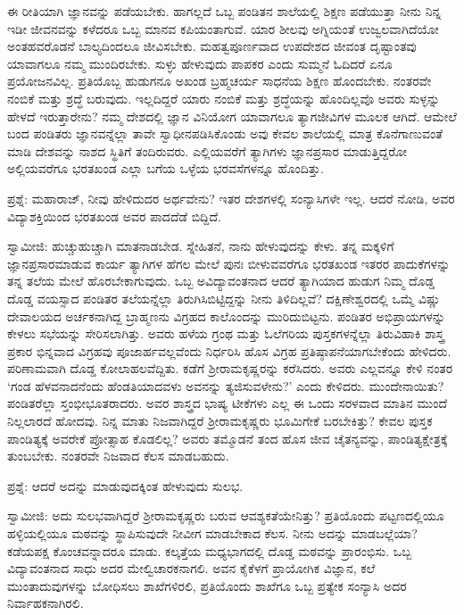 ಈ ರೀತಿಯಾಗಿ ಜ್ಞಾನವನ್ನು ಪಡೆಯಬೇಕು. ಹಾಗಲ್ಲದೆ ಒಬ್ಬ ಪಂಡಿತನ ಶಾಲೆಯಲ್ಲಿ ಶಿಕ್ಷಣ ಪಡೆಯುತ್ತಾ ನೀನು ನಿನ್ನ ಇಡೀ ಜೀವನವನ್ನು ಕಳೆದರೂ ಒಬ್ಬ ಮಾನವ ಕಪಿಯಂತಾಗುವೆ. ಯಾರ ಶೀಲವು ಅಗ್ನಿಯಂತೆ ಉಜ್ವಲವಾಗಿದೆಯೋ ಅಂತಹವರೊಡನೆ ಬಾಲ್ಯದಿಂದಲೂ ಜೀವಿಸಬೇಕು. ಮಹತ್ವಪೂರ್ಣವಾದ ಉಪದೇಶದ ಜೀವಂತ ದೃಷ್ಟಾಂತವು ಯಾವಾಗಲೂ ನಮ್ಮ ಮುಂದಿರಬೇಕು. ಸುಳ್ಳು ಹೇಳುವುದು ಪಾಪಕರ ಎಂದು ಸುಮ್ಮನೆ ಓದಿದರೆ ಏನೂ ಪ್ರಯೋಜನವಿಲ್ಲ. ಪ್ರತಿಯೊಬ್ಬ ಹುಡುಗನೂ ಅಖಂಡ ಬ್ರಹ್ಮಚರ್ಯ ಸಾಧನೆಯ ಶಿಕ್ಷಣ ಹೊಂದಬೇಕು. ನಂತರವೇ ನಂಬಿಕೆ ಮತ್ತು ಶ್ರದ್ಧೆ ಬರುವುದು. ಇಲ್ಲದಿದ್ದರೆ ಯಾರು ನಂಬಿಕೆ ಮತ್ತು ಶ್ರದ್ಧೆಯನ್ನು ಹೊಂದಿಲ್ಲವೊ ಅವರು ಸುಳ್ಳನ್ನು ಹೇಳದೆ ಇರುತ್ತಾರೇನು? ನಮ್ಮ ದೇಶದಲ್ಲಿ ಜ್ಞಾನ ವಿನಿಯೋಗ ಯಾವಾಗಲೂ ತ್ಯಾಗಜೀವಿಗಳ ಮೂಲಕ ಆಗಿದೆ. ಆಮೇಲೆ ಬಂದ ಪಂಡಿತರು ಜ್ಞಾನವನ್ನೆಲ್ಲಾ ತಾವೇ ಸ್ವಾಧೀನಪಡಿಸಿಕೊಂಡು ಅವು ಕೇವಲ ಶಾಲೆಯಲ್ಲಿ ಮಾತ್ರ ಕೊನೆಗಾಣುವಂತೆ ಮಾಡಿ ದೇಶವನ್ನು ನಾಶದ ಸ್ಥಿತಿಗೆ ತಂದಿರುವರು. ಎಲ್ಲಿಯವರೆಗೆ ತ್ಯಾಗಿಗಳು ಜ್ಞಾನಪ್ರಸಾರ ಮಾಡುತ್ತಿದ್ದರೋ ಅಲ್ಲಿಯವರೆಗೂ ಭರತಖಂಡ ಎಲ್ಲಾ ಬಗೆಯ ಒಳ್ಳೆಯ ಭರವಸೆಗಳನ್ನೂ ಹೊಂದಿತ್ತು.

ಪ್ರಶ್ನೆ: ಮಹಾರಾಜ್, ನೀವು ಹೇಳಿದುದರ ಅರ್ಥವೇನು? ಇತರ ದೇಶಗಳಲ್ಲಿ ಸಂನ್ಯಾಸಿಗಳೇ ಇಲ್ಲ. ಆದರೆ ನೋಡಿ, ಅವರ ವಿದ್ಯಾಶಕ್ತಿಯಿಂದ ಭರತಖಂಡ ಅವರ ಪಾದದೆಡೆ ಬಿದ್ದಿದೆ.

ಸ್ವಾಮೀಜಿ: ಹುಚ್ಚುಹುಚ್ಚಾಗಿ ಮಾತನಾಡಬೇಡ. ಸ್ನೇಹಿತನೆ, ನಾನು ಹೇಳುವುದನ್ನು ಕೇಳು. ತನ್ನ ಮಕ್ಕಳಿಗೆ ಜ್ಞಾನಪ್ರಸಾರಮಾಡುವ ಕಾರ್ಯ ತ್ಯಾಗಿಗಳ ಹೆಗಲ ಮೇಲೆ ಪುನಃ ಬೀಳುವವರೆಗೂ ಭರತಖಂಡ ಇತರರ ಪಾದುಕೆಗಳನ್ನು ತನ್ನ ತಲೆಯ ಮೇಲೆ ಹೊರಬೇಕಾಗುವುದು. ಒಬ್ಬ ಅವಿದ್ಯಾವಂತನಾದ ಆದರೆ ತ್ಯಾಗಿಯಾದ ಹುಡುಗ ನಿಮ್ಮ ದೊಡ್ಡ ದೊಡ್ಡ ವಯಸ್ಸಾದ ಪಂಡಿತರ ತಲೆಯನ್ನೆಲ್ಲಾ ತಿರುಗಿಸಿಬಿಟ್ಟಿದ್ದನ್ನು ನೀನು ತಿಳಿದಿಲ್ಲವೆ? ದಕ್ಷಿಣೇಶ್ವರದಲ್ಲಿ ಒಮ್ಮೆ ವಿಷ್ಣು ದೇವಾಲಯದ ಅರ್ಚಕನಾಗಿದ್ದ ಬ್ರಾಹ್ಮಣನು ವಿಗ್ರಹದ ಕಾಲೊಂದನ್ನು ಮುರಿದುಬಿಟ್ಟನು. ಪಂಡಿತರ ಅಭಿಪ್ರಾಯಗಳನ್ನು ಕೇಳಲು ಸಭೆಯನ್ನು ಸೇರಿಸಲಾಗಿತ್ತು. ಅವರು ಹಳೆಯ ಗ್ರಂಥ ಮತ್ತು ಓಲೆಗರಿಯ ಪುಸ್ತಕಗಳನ್ನೆಲ್ಲಾ ತಿರುವಿಹಾಕಿ ಶಾಸ್ತ್ರ ಪ್ರಕಾರ ಭಿನ್ನವಾದ ವಿಗ್ರಹವು ಪೂಜಾರ್ಹವಲ್ಲವೆಂದು ನಿರ್ಧರಿಸಿ ಹೊಸ ವಿಗ್ರಹ ಪ್ರತಿಷ್ಠಾಪನೆಯಾಗಬೇಕೆಂದು ಹೇಳಿದರು. ಪರಿಣಾಮವಾಗಿ ದೊಡ್ಡ ಕೋಲಾಹಲವೆದ್ದಿತು. ಕಡೆಗೆ ಶ‍್ರೀರಾಮಕೃಷ್ಣರನ್ನು ಕರೆಸಿದರು. ಅವರು ಎಲ್ಲವನ್ನೂ ಕೇಳಿ ನಂತರ ‘ಗಂಡ ಹೆಳವನಾದನೆಂದು ಹೆಂಡತಿಯಾದವಳು ಅವನನ್ನು ತ್ಯಜಿಸುವಳೇನು?’ ಎಂದು ಕೇಳಿದರು. ಮುಂದೇನಾಯಿತು? ಪಂಡಿತರೆಲ್ಲಾ ಸ್ತಂಭೀಭೂತರಾದರು. ಅವರ ಶಾಸ್ತ್ರದ ಭಾಷ್ಯ ಟೀಕೆಗಳು ಎಲ್ಲ ಈ ಒಂದು ಸರಳವಾದ ಮಾತಿನ ಮುಂದೆ ನಿಲ್ಲಲಾರದೆ ಹೋದವು. ನಿನ್ನ ಮಾತು ನಿಜವಾಗಿದ್ದರೆ ಶ‍್ರೀರಾಮಕೃಷ್ಣರು ಭೂಮಿಗೇಕೆ ಬರಬೇಕಿತ್ತು? ಕೇವಲ ಪುಸ್ತಕ ಪಾಂಡಿತ್ಯಕ್ಕೆ ಅವರೇಕೆ ಪ್ರೋತ್ಸಾಹ ಕೊಡಲಿಲ್ಲ? ಅವರು ತಮ್ಮೊಡನೆ ತಂದ ಹೊಸ ಜೀವ ಚೈತನ್ಯವನ್ನು, ಪಾಂಡಿತ್ಯಕ್ಷೇತ್ರಕ್ಕೆ ತುಂಬಬೇಕು. ನಂತರವೇ ನಿಜವಾದ ಕೆಲಸ ಮಾಡಬಹುದು.

ಪ್ರಶ್ನೆ: ಆದರೆ ಅದನ್ನು ಮಾಡುವುದಕ್ಕಿಂತ ಹೇಳುವುದು ಸುಲಭ.

ಸ್ವಾಮೀಜಿ: ಅದು ಸುಲಭವಾಗಿದ್ದರೆ ಶ‍್ರೀರಾಮಕೃಷ್ಣರು ಬರುವ ಆವಶ್ಯಕತೆಯೇನಿತ್ತು? ಪ್ರತಿಯೊಂದು ಪಟ್ಟಣದಲ್ಲಿಯೂ ಹಳ್ಳಿಯಲ್ಲಿಯೂ ಮಠವನ್ನು ಸ್ಥಾಪಿಸುವುದೇ ನೀವೀಗ ಮಾಡಬೇಕಾದ ಕೆಲಸ. ನೀನು ಅದನ್ನು ಮಾಡಬಲ್ಲೆಯಾ? ಕಡೆಯಪಕ್ಷ ಕೊಂಚವನ್ನಾದರೂ ಮಾಡು. ಕಲ್ಕತ್ತೆಯ ಮಧ್ಯಭಾಗದಲ್ಲಿ ದೊಡ್ಡ ಮಠವನ್ನು ಪ್ರಾರಂಭಿಸು. ಒಬ್ಬ ವಿದ್ಯಾವಂತನಾದ ಸಾಧು ಅದರ ಮೇಲ್ವಿಚಾರಕನಾಗಲಿ. ಅವನ ಕೈಕೆಳಗೆ ಪ್ರಾಯೋಗಿಕ ವಿಜ್ಞಾನ, ಕಲೆ ಮುಂತಾದುವುಗಳನ್ನು ಬೋಧಿಸಲು ಶಾಖೆಗಳಿರಲಿ, ಪ್ರತಿಯೊಂದು ಶಾಖೆಗೂ ಒಬ್ಬ ಪ್ರತ್ಯೇಕ ಸಂನ್ಯಾಸಿ ಅದರ ನಿರ್ವಾಹಕನಾಗಿರಲಿ.

